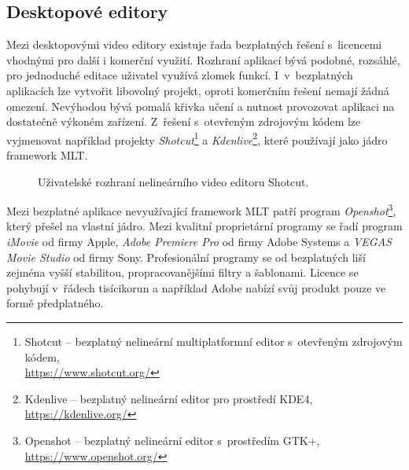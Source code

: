 \subsection{Desktopové editory}
Mezi desktopovými video editory existuje řada bezplatných řešení s~licencemi vhodnými pro další i komerční využití. Rozhraní aplikací bývá podobné, rozsáhlé, pro jednoduché editace uživatel využívá zlomek funkcí. I~v~bezplatných aplikacích lze vytvořit libovolný projekt, oproti komerčním řešení nemají žádná omezení. Nevýhodou bývá pomalá křivka učení a nutnost provozovat aplikaci na dostatečně výkoném zařízení. Z~řešení s~otevřeným zdrojovým kódem lze vyjmenovat například projekty \textit{Shotcut}\footnote{Shotcut -- bezplatný nelineární multiplatformní editor s~otevřeným zdrojovým kódem,\\\url{https://www.shotcut.org/}} a \textit{Kdenlive}\footnote{Kdenlive -- bezplatný nelineární editor pro prostředí KDE4, \url{https://kdenlive.org/}}, které používají jako jádro framework MLT.
\begin{figure}[ht]
	\centering
	\caption{Uživatelské rozhraní nelineárního video editoru Shotcut. }\label{img:shotcut}
\end{figure}
Mezi bezplatné aplikace nevyužívající framework MLT patří program \textit{Openshot}\footnote{Openshot -- bezplatný nelineární editor s~prostředím GTK+, \url{https://www.openshot.org/}}, který přešel na vlastní jádro. Mezi kvalitní proprietární programy se řadí program \textit{iMovie} od firmy Apple, \textit{Adobe Premiere Pro} od firmy Adobe Systems a \textit{ VEGAS Movie Studio} od firmy Sony. Profesionální programy se od bezplatných liší zejména vyšší stabilitou, propracovanějšími filtry a šablonami. Licence se pohybují v~řádech tisícikorun a například Adobe nabízí svůj produkt pouze ve formě předplatného.

